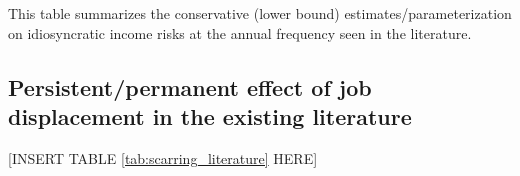 \begin{sidewaystable}[p]
\begin{adjustbox}{width={\textwidth}}
\begin{threeparttable}
\begin{tabular}{llllllll}
\hline
\hline 
\end{tabular} 
	\begin{flushleft}
\item This table summarizes the  conservative (lower bound) estimates/parameterization on idiosyncratic income risks at the annual frequency seen in the literature.    \end{flushleft}
\end{threeparttable}
\end{adjustbox}
	\end{sidewaystable}
	
	
	

\subsection{Persistent/permanent effect of job displacement in the existing literature}

\begin{center}
[INSERT TABLE \ref{tab:scarring_literature} HERE]  
\end{center}

